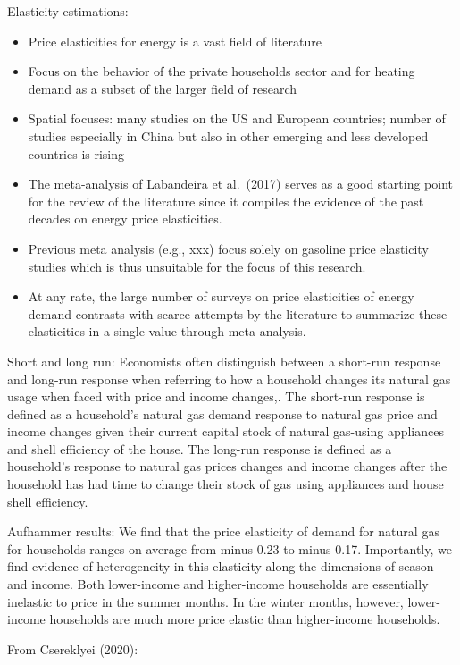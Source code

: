 \documentclass[12pt,twoside]{reedthesis}
\providecommand{\tightlist}{%
  \setlength{\itemsep}{0pt}\setlength{\parskip}{0pt}}
\begin{document}
Elasticity estimations:
\begin{itemize}
\tightlist
\item
  Price elasticities for energy is a vast field of literature
\item
  Focus on the behavior of the private households sector and for heating demand as a subset of the larger field of research
\item
  Spatial focuses: many studies on the US and European countries; number of studies especially in China but also in other emerging and less developed countries is rising
\item
  The meta-analysis of Labandeira et al.~(2017) serves as a good starting point for the review of the literature since it compiles the evidence of the past decades on energy price elasticities.
\item
  Previous meta analysis (e.g., xxx) focus solely on gasoline price elasticity studies which is thus unsuitable for the focus of this research.
\item
  At any rate, the large number of surveys on price elasticities of energy demand contrasts with scarce attempts by the literature to summarize these elasticities in a single value through meta-analysis.
\end{itemize}
Short and long run: Economists often distinguish between a short-run response and long-run response when referring to how a household changes its natural gas usage when faced with price and income changes,. The short-run response is defined as a household's natural gas demand response to natural gas price and income changes given their current capital stock of natural gas-using appliances and shell efficiency of the house. The long-run response is defined as a household's response to natural gas prices changes and income changes after the household has had time to change their stock of gas using appliances and house shell efficiency.

Aufhammer results:
We find that the price elasticity of demand for natural gas for households ranges on average from minus 0.23 to minus 0.17. Importantly, we find evidence of heterogeneity in this elasticity along the dimensions of season and income. Both lower-income and higher-income households are essentially inelastic to price in the summer months. In the winter months, however, lower-income households are much more price elastic than higher-income households.

From Csereklyei (2020):
\end{document}
